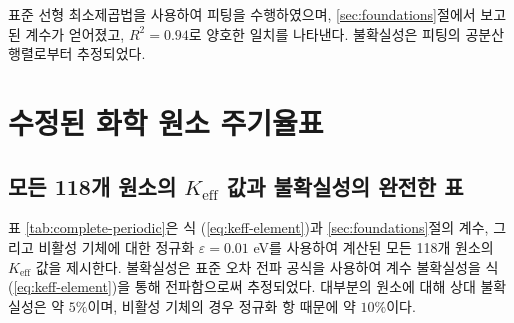 \documentclass[12pt,a4paper]{article}
\newcommand{\Keff}{K_{\mathrm{eff}}}
\begin{document}
	표준 선형 최소제곱법을 사용하여 피팅을 수행하였으며, \ref{sec:foundations}절에서 보고된 계수가 얻어졌고, $R^2 = 0.94$로 양호한 일치를 나타낸다. 불확실성은 피팅의 공분산 행렬로부터 추정되었다.
	
	\section{수정된 화학 원소 주기율표}
	\label{sec:periodic-table}
	
	\subsection{모든 118개 원소의 $\Keff$ 값과 불확실성의 완전한 표}
	
	표 \ref{tab:complete-periodic}은 식 (\ref{eq:keff-element})과 \ref{sec:foundations}절의 계수, 그리고 비활성 기체에 대한 정규화 $\varepsilon = 0.01$ eV를 사용하여 계산된 모든 118개 원소의 $\Keff$ 값을 제시한다. 불확실성은 표준 오차 전파 공식을 사용하여 계수 불확실성을 식 (\ref{eq:keff-element})을 통해 전파함으로써 추정되었다. 대부분의 원소에 대해 상대 불확실성은 약 $5\%$이며, 비활성 기체의 경우 정규화 항 때문에 약 $10\%$이다.
	
\end{document}
